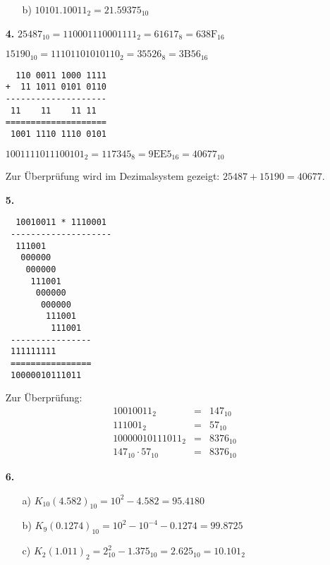 \documentclass[a4paper,10pt]{scrartcl}
\begin{document}
\begin{enumerate}
\begin{enumerate}
            \item[b)]
                $10101.10011_2 = 21.59375_{10}$
        \end{enumerate}

    \item[\textbf{4.}]
        $25487_{10} = 110001110001111_2 = 61617_8 = 638\text{F}_{16}$

        $15190_{10} = 11101101010110_2 = 35526_8 = 3\text{B}56_{16}$

        \begin{verbatim}
  110 0011 1000 1111
+  11 1011 0101 0110
--------------------
 11    11    11 11
====================
 1001 1110 1110 0101
        \end{verbatim}

        $1001111011100101_2 = 117345_8 = 9\text{EE}5_{16} = 40677_{10}$

        Zur Überprüfung wird im Dezimalsystem gezeigt: $25487 + 15190 = 40677$.

    \newpage
    \item[\textbf{5.}]
        \begin{verbatim}
  10010011 * 1110001
 --------------------
  111001
   000000
    000000
     111001
      000000
       000000
        111001
         111001
 ----------------
 111111111
 ================
 10000010111011
        \end{verbatim}

        Zur Überprüfung:
        $$\begin{array}{rcl}
            10010011_2 &=& 147_{10}\\
            111001_2 &=& 57_{10}\\
            10000010111011_2 &=& 8376_{10}\\
            147_{10} \cdot 57_{10} &=& 8376_{10}
        \end{array}$$

    \item[\textbf{6.}]
        \begin{enumerate}
            \item[a)]
                $K_{10}(4.582)_{10} = 10^2 - 4.582 = 95.4180$

            \item[b)]
                $K_{9}(0.1274)_{10} = 10^2 - 10^{-4} - 0.1274 = 99.8725$

            \item[c)]
                $K_2(1.011)_2 = 2_{10}^2 - 1.375_{10} = 2.625_{10} = 10.101_2$


\end{enumerate}
\end{enumerate}
\end{document}
